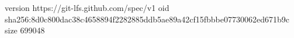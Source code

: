 version https://git-lfs.github.com/spec/v1
oid sha256:8d0c800dac38c4658894f2282885ddb5ae89a42cf15fbbbe07730062ed671b9c
size 699048
